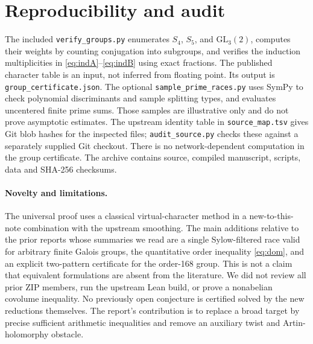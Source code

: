 \documentclass[11pt]{article}
\theoremstyle{remark}\newtheorem{remark}[theorem]{Remark}
\begin{document}
\section{Reproducibility and audit}
The included \texttt{verify\_groups.py} enumerates $S_4$, $S_5$, and $\mathrm{GL}_3(2)$, computes their weights by counting conjugation into subgroups, and verifies the induction multiplicities in \eqref{eq:indA}--\eqref{eq:indB} using exact fractions. The published character table is an input, not inferred from floating point. Its output is \texttt{group\_certificate.json}. The optional \texttt{sample\_prime\_races.py} uses SymPy to check polynomial discriminants and sample splitting types, and evaluates uncentered finite prime sums. Those samples are illustrative only and do not prove asymptotic estimates. The upstream identity table in \texttt{source\_map.tsv} gives Git blob hashes for the inspected files; \texttt{audit\_source.py} checks these against a separately supplied Git checkout. There is no network-dependent computation in the group certificate. The archive contains source, compiled manuscript, scripts, data and SHA-256 checksums.

\paragraph{Novelty and limitations.} The universal proof uses a classical virtual-character method in a new-to-this-note combination with the upstream smoothing. The main additions relative to the prior reports whose summaries we read are a single Sylow-filtered race valid for arbitrary finite Galois groups, the quantitative order inequality \eqref{eq:dom}, and an explicit two-pattern certificate for the order-168 group. This is not a claim that equivalent formulations are absent from the literature. We did not review all prior ZIP members, run the upstream Lean build, or prove a nonabelian covolume inequality. No previously open conjecture is certified solved by the new reductions themselves. The report's contribution is to replace a broad target by precise sufficient arithmetic inequalities and remove an auxiliary twist and Artin-holomorphy obstacle.
\end{document}

